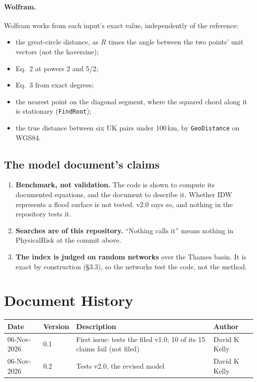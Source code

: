 \documentclass[11pt,a4paper]{article}
\renewcommand{\mkmhistorypage}[1]{%
    \section{Document History}
    \begin{table}[ht]
        \centering
        \begin{tabular}{l|l|p{9cm}|l}
            \textbf{Date} & \textbf{Version} & \textbf{Description} & \textbf{Author} \\
            \hline
            #1
        \end{tabular}
    \end{table}
}
\begin{document}
\paragraph{Wolfram.} Wolfram works from each input's exact value, independently of the
reference:
\begin{itemize}[leftmargin=*,nosep]
\item the great-circle distance, as $R$ times the angle between the two points' unit
  vectors (not the haversine);
\item Eq.~2 at powers 2 and 5/2;
\item Eq.~3 from exact degrees;
\item the nearest point on the diagonal segment, where the squared chord along it is
  stationary (\texttt{FindRoot});
\item the true distance between six UK pairs under 100\,km, by \texttt{GeoDistance} on
  WGS84.
\end{itemize}

\mkmvalidation



\subsection{The model document's claims}


\mkmlimitations

\begin{enumerate}[leftmargin=*]
\item \textbf{Benchmark, not validation.} The code is shown to compute its documented
  equations, and the document to describe it. Whether IDW represents a flood surface is
  not tested. v2.0 says so, and nothing in the repository tests it.
\item \textbf{Searches are of this repository.} ``Nothing calls it'' means nothing in
  PhysicalRisk at the commit above.
\item \textbf{The index is judged on random networks} over the Thames basin. It is exact
  by construction (\S3.3), so the networks test the code, not the method.
\end{enumerate}

\mkmhistorypage{06-Nov-2026 & 0.1 & First issue: tests the filed v1.0; 10 of its 15 claims fail (not filed) & David K Kelly \\
06-Nov-2026 & 0.2 & Tests v2.0, the revised model & David K Kelly \\}
\end{document}
